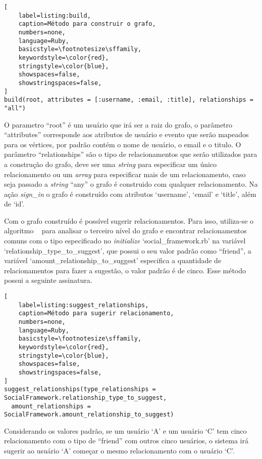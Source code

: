 \begin{lstlisting}[
    label=listing:build,
    caption=Método para construir o grafo,
    numbers=none,
    language=Ruby,
    basicstyle=\footnotesize\sffamily,
    keywordstyle=\color{red},
    stringstyle=\color{blue},
    showspaces=false,
    showstringspaces=false,
]
build(root, attributes = [:username, :email, :title], relationships = "all")
\end{lstlisting}

O parametro ``root'' é um usuário que irá ser a raiz do grafo, o parâmetro ``attributes'' corresponde aos atributos de usuário e evento que serão mapeados para os vértices, por padrão contém o nome de usuário, o email e o titulo. O parâmetro ``relationships'' são o tipo de relacionamentos que serão utilizados para a construção do grafo, deve ser uma \textit{string} para especificar um único relacionamento ou um \textit{array} para especificar mais de um relacionamento, caso seja passado a \textit{string} ``any'' o grafo é construido com qualquer relacionamento. Na ação \textit{sign\_in} o grafo é construído com atributos `username', `email' e `title', além de `id'.

Com o grafo construído é possível sugerir relacionamentos. Para isso, utiliza-se o algoritmo ~ para analisar o terceiro nível do grafo e encontrar relacionamentos comuns com o tipo especificado no \textit{initialize} `social\_framework.rb' na variável `relationship\_type\_to\_suggest', que possui o seu valor padrão como ``friend'', a variável `amount\_relationship\_to\_suggest' especifica a quantidade de relacionamentos para fazer a sugestão, o valor padrão é de cinco. Esse método possui a seguinte assinatura.

\begin{lstlisting}[
    label=listing:suggest_relationships,
    caption=Método para sugerir relacionamento,
    numbers=none,
    language=Ruby,
    basicstyle=\footnotesize\sffamily,
    keywordstyle=\color{red},
    stringstyle=\color{blue},
    showspaces=false,
    showstringspaces=false,
]
suggest_relationships(type_relationships = SocialFramework.relationship_type_to_suggest,
  amount_relationships = SocialFramework.amount_relationship_to_suggest)
\end{lstlisting}

Considerando os valores padrão, se um usuário `A' e um usuário `C' tem cinco relacionamento com o tipo de ``friend'' com outros cinco usuários, o sistema irá sugerir ao usuário `A' começar o mesmo relacionamento com o usuário `C'.

